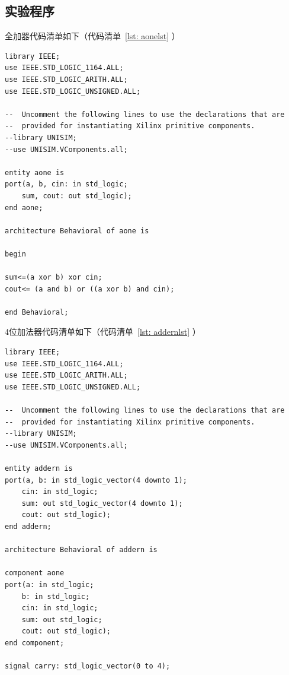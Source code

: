 \documentclass{article}
\begin{document}
\begin{CJK*}{UTF8}{gbsn}

\section{实验程序}
全加器代码清单如下（代码清单~\ref{lst: aonelst} ）
\begin{center}
\begin{lstlisting}[caption = {全加器代码清单}, label = {lst: aonelst}]
library IEEE;
use IEEE.STD_LOGIC_1164.ALL;
use IEEE.STD_LOGIC_ARITH.ALL;
use IEEE.STD_LOGIC_UNSIGNED.ALL;

--  Uncomment the following lines to use the declarations that are
--  provided for instantiating Xilinx primitive components.
--library UNISIM;
--use UNISIM.VComponents.all;

entity aone is
port(a, b, cin: in std_logic;
	sum, cout: out std_logic);
end aone;

architecture Behavioral of aone is

begin

sum<=(a xor b) xor cin;
cout<= (a and b) or ((a xor b) and cin);

end Behavioral;
\end{lstlisting}
\end{center}

4位加法器代码清单如下（代码清单~\ref{lst: addernlst} ）
\begin{center}
\begin{lstlisting}[caption = {4位加法器代码清单}, label = {lst: addernlst}]
library IEEE;
use IEEE.STD_LOGIC_1164.ALL;
use IEEE.STD_LOGIC_ARITH.ALL;
use IEEE.STD_LOGIC_UNSIGNED.ALL;

--  Uncomment the following lines to use the declarations that are
--  provided for instantiating Xilinx primitive components.
--library UNISIM;
--use UNISIM.VComponents.all;

entity addern is
port(a, b: in std_logic_vector(4 downto 1);
	cin: in std_logic;
	sum: out std_logic_vector(4 downto 1);
	cout: out std_logic);
end addern;

architecture Behavioral of addern is

component aone
port(a: in std_logic;
	b: in std_logic;
	cin: in std_logic;
	sum: out std_logic;
	cout: out std_logic);
end component;

signal carry: std_logic_vector(0 to 4);


\end{lstlisting}
\end{center}
\end{CJK*}
\end{document}
